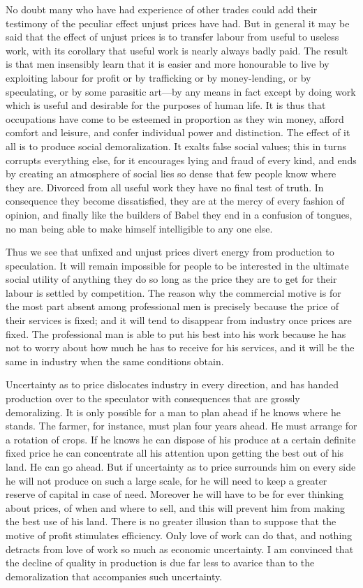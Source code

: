 \documentclass{book}
\begin{document}
No doubt many who have had experience of other trades could add their testimony of the peculiar effect unjust prices have had. But in general it may be said that the effect of unjust prices is to transfer labour from useful to useless work, with its corollary that useful work is nearly always badly paid. The result is that men insensibly learn that it is easier and more honourable to live by exploiting labour for profit or by trafficking or by money-lending, or by speculating, or by some parasitic art—by any means in fact except by doing work which is useful and desirable for the purposes of human life. It is thus that occupations have come to be esteemed in proportion as they win money, afford comfort and leisure, and confer individual power and distinction. The effect of it all is to produce social demoralization. It exalts false social values; this in turns corrupts everything else, for it encourages lying and fraud of every kind, and ends by creating an atmosphere of social lies so dense that few people know where they are. Divorced from all useful work they have no final test of truth. In consequence they become dissatisfied, they are at the mercy of every fashion of opinion, and finally like the builders of Babel they end in a confusion of tongues, no man being able to make himself intelligible to any one else.

Thus we see that unfixed and unjust prices divert energy from production to speculation. It will remain impossible for people to be interested in the ultimate social utility of anything they do so long as the price they are to get for their labour is settled by competition. The reason why the commercial motive is for the most part absent among professional men is precisely because the price of their services is fixed; and it will tend to disappear from industry once prices are fixed. The professional man is able to put his best into his work because he has not to worry about how much he has to receive for his services, and it will be the same in industry when the same conditions obtain.

Uncertainty as to price dislocates industry in every direction, and has handed production over to the speculator with consequences that are grossly demoralizing. It is only possible for a man to plan ahead if he knows where he stands. The farmer, for instance, must plan four years ahead. He must arrange for a rotation of crops. If he knows he can dispose of his produce at a certain definite fixed price he can concentrate all his attention upon getting the best out of his land. He can go ahead. But if uncertainty as to price surrounds him on every side he will not produce on such a large scale, for he will need to keep a greater reserve of capital in case of need. Moreover he will have to be for ever thinking about prices, of when and where to sell, and this will prevent him from making the best use of his land. There is no greater illusion than to suppose that the motive of profit stimulates efficiency. Only love of work can do that, and nothing detracts from love of work so much as economic uncertainty. I am convinced that the decline of quality in production is due far less to avarice than to the demoralization that accompanies such uncertainty.
\end{document}
